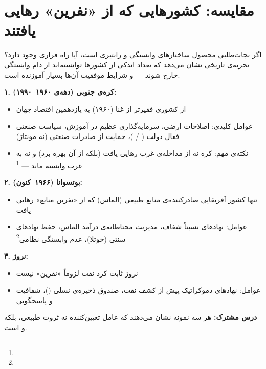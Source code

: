 \section{مقایسه: کشورهایی که از «نفرین» رهایی یافتند}
\label{sec:ch12-success-cases}

اگر نجات‌طلبی محصول ساختارهای وابستگی و رانتیری است، آیا راه فراری وجود دارد؟ تجربه‌ی تاریخی نشان می‌دهد که تعداد اندکی از کشورها توانسته‌اند از دام وابستگی خارج شوند — و شرایط موفقیت آن‌ها بسیار آموزنده است.

\begin{tcolorbox}[successbox, title={نمونه‌های خروج از دام وابستگی}]
\textbf{۱. کره‌ی جنوبی (دهه‌ی ۱۹۶۰–۱۹۹۰):}
\begin{itemize}
\item از کشوری فقیرتر از غنا (۱۹۶۰) به یازدهمین اقتصاد جهان
\item عوامل کلیدی: اصلاحات ارضی، سرمایه‌گذاری عظیم در آموزش، سیاست صنعتی فعال دولت ( / )، حمایت از صادرات صنعتی (نه مونتاژ)
\item نکته‌ی مهم: کره نه از مداخله‌ی غرب رهایی یافت (بلکه از آن بهره برد) و نه به غرب وابسته ماند — \footnote{}
\end{itemize}

\textbf{۲. بوتسوانا (۱۹۶۶–کنون):}
\begin{itemize}
\item تنها کشور آفریقایی صادرکننده‌ی منابع طبیعی (الماس) که از «نفرین منابع» رهایی یافت
\item عوامل: نهادهای نسبتاً شفاف، مدیریت محتاطانه‌ی درآمد الماس، حفظ نهادهای سنتی (خوتلا)، عدم وابستگی نظامی\footnote{}
\end{itemize}

\textbf{۳. نروژ:}
\begin{itemize}
\item نروژ ثابت کرد نفت لزوماً «نفرین» نیست
\item عوامل: نهادهای دموکراتیک پیش از کشف نفت، صندوق ذخیره‌ی نسلی ()، شفافیت و پاسخگویی
\end{itemize}

\textbf{درس مشترک:} هر سه نمونه نشان می‌دهند که عامل تعیین‌کننده نه ثروت طبیعی، بلکه  و  است.
\end{tcolorbox}


